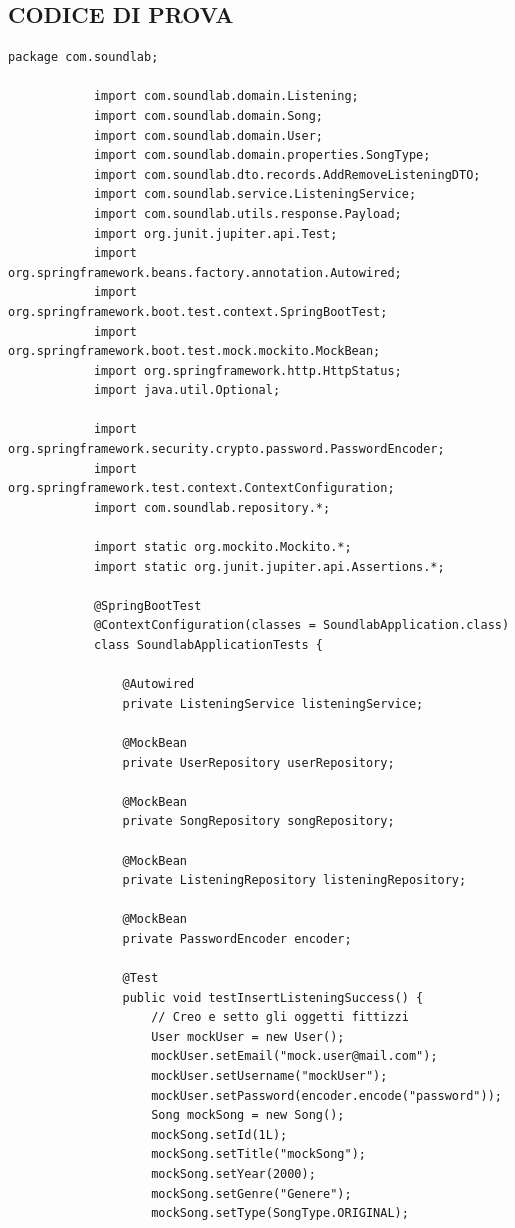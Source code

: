 \documentclass{article}
\begin{document}
		\subsection{CODICE DI PROVA}
		\begin{lstlisting}[style=JavaStyle, caption={Il tuo codice Java}, label={lst:java_code}]
			package com.soundlab;
			
			import com.soundlab.domain.Listening;
			import com.soundlab.domain.Song;
			import com.soundlab.domain.User;
			import com.soundlab.domain.properties.SongType;
			import com.soundlab.dto.records.AddRemoveListeningDTO;
			import com.soundlab.service.ListeningService;
			import com.soundlab.utils.response.Payload;
			import org.junit.jupiter.api.Test;
			import org.springframework.beans.factory.annotation.Autowired;
			import org.springframework.boot.test.context.SpringBootTest;
			import org.springframework.boot.test.mock.mockito.MockBean;
			import org.springframework.http.HttpStatus;
			import java.util.Optional;
			
			import org.springframework.security.crypto.password.PasswordEncoder;
			import org.springframework.test.context.ContextConfiguration;
			import com.soundlab.repository.*;
			
			import static org.mockito.Mockito.*;
			import static org.junit.jupiter.api.Assertions.*;
			
			@SpringBootTest
			@ContextConfiguration(classes = SoundlabApplication.class)
			class SoundlabApplicationTests {
				
				@Autowired
				private ListeningService listeningService;
				
				@MockBean
				private UserRepository userRepository;
				
				@MockBean
				private SongRepository songRepository;
				
				@MockBean
				private ListeningRepository listeningRepository;
				
				@MockBean
				private PasswordEncoder encoder;
				
				@Test
				public void testInsertListeningSuccess() {
					// Creo e setto gli oggetti fittizzi
					User mockUser = new User();
					mockUser.setEmail("mock.user@mail.com");
					mockUser.setUsername("mockUser");
					mockUser.setPassword(encoder.encode("password"));
					Song mockSong = new Song();
					mockSong.setId(1L);
					mockSong.setTitle("mockSong");
					mockSong.setYear(2000);
					mockSong.setGenre("Genere");
					mockSong.setType(SongType.ORIGINAL);
					

\end{lstlisting}
\end{document}
